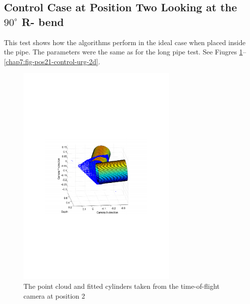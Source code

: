 \subsection{Control Case at Position Two Looking at the $90^\circ$ R- bend}
This test shows how the algorithms perform in the ideal case when placed inside the
pipe. The parameters were the same as for the long pipe test. See Fiugres
\ref{chap7:fig-pos21-control-tof-3d}--\ref{chap7:fig-pos21-control-urg-2d}.
\begin{figure}[htbp]
    \centering
    \includegraphics[width=0.7\textwidth]{pics/pos21-control-tof-3d}
    \caption{The point cloud and fitted cylinders taken from the time-of-flight camera at
    position 2}
    \label{chap7:fig-pos21-control-tof-3d}
\end{figure}

